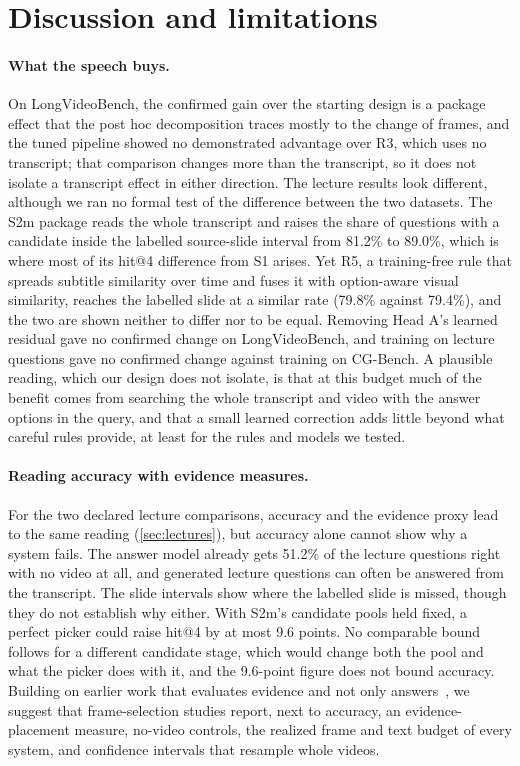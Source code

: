 \section{Discussion and limitations}
\label{sec:discussion}

\paragraph{What the speech buys.}
On LongVideoBench, the confirmed gain over the starting design is a package effect that the post hoc decomposition traces mostly to the change of frames, and the tuned pipeline showed no demonstrated advantage over R3, which uses no transcript; that comparison changes more than the transcript, so it does not isolate a transcript effect in either direction.
The lecture results look different, although we ran no formal test of the difference between the two datasets.
The S2m package reads the whole transcript and raises the share of questions with a candidate inside the labelled source-slide interval from 81.2\% to 89.0\%, which is where most of its hit@4 difference from S1 arises.
Yet R5, a training-free rule that spreads subtitle similarity over time and fuses it with option-aware visual similarity, reaches the labelled slide at a similar rate (79.8\% against 79.4\%), and the two are shown neither to differ nor to be equal.
Removing Head A's learned residual gave no confirmed change on LongVideoBench, and training on lecture questions gave no confirmed change against training on CG-Bench.
A plausible reading, which our design does not isolate, is that at this budget much of the benefit comes from searching the whole transcript and video with the answer options in the query, and that a small learned correction adds little beyond what careful rules provide, at least for the rules and models we tested.

\paragraph{Reading accuracy with evidence measures.}
For the two declared lecture comparisons, accuracy and the evidence proxy lead to the same reading (\cref{sec:lectures}), but accuracy alone cannot show why a system fails.
The answer model already gets 51.2\% of the lecture questions right with no video at all, and generated lecture questions can often be answered from the transcript.
The slide intervals show where the labelled slide is missed, though they do not establish why either.
With S2m's candidate pools held fixed, a perfect picker could raise hit@4 by at most 9.6 points.
No comparable bound follows for a different candidate stage, which would change both the pool and what the picker does with it, and the 9.6-point figure does not bound accuracy.
Building on earlier work that evaluates evidence and not only answers~\cite{li2025kfsbench,huang2026egvqa}, we suggest that frame-selection studies report, next to accuracy, an evidence-placement measure, no-video controls, the realized frame and text budget of every system, and confidence intervals that resample whole videos.

